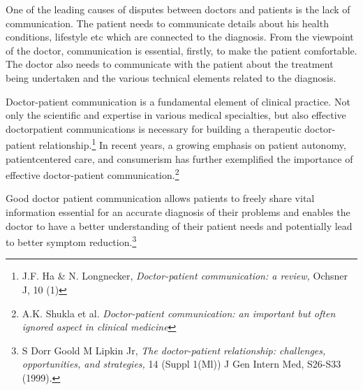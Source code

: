 \begin{multicols}{2}
\noi
One of the leading causes of disputes between doctors and patients is the lack of communication. The patient needs to communicate details about his health conditions, lifestyle etc which are connected to the diagnosis. From the viewpoint of the doctor, communication is essential, firstly, to make the patient comfortable. The doctor also needs to communicate with the patient about the treatment being undertaken and the various technical elements related to the diagnosis.

\noi
Doctor-patient communication is a fundamental element of clinical practice. Not only the scientific and expertise in various medical specialties, but also effective doctorpatient communications is necessary for building a therapeutic doctor-patient relationship.\footnote{J.F. Ha \& N. Longnecker, \textit{Doctor-patient communication: a review,} Ochsner J, 10 (1)} In recent years, a growing emphasis on patient autonomy, patientcentered care, and consumerism has further exemplified the importance of effective doctor-patient communication.\footnote{A.K. Shukla et al. \textit{Doctor-patient communication: an important but often ignored aspect in clinical medicine}}

\noi
Good doctor patient communication allows patients to freely share vital information essential for an accurate diagnosis of their problems and enables the doctor to have a better understanding of their patient needs and potentially lead to better symptom reduction.\footnote{S Dorr Goold M Lipkin Jr, \textit{The doctor-patient relationship: challenges, opportunities, and
strategies,} 14 (Suppl 1(Ml)) J Gen Intern Med, S26-S33 (1999).}



\end{multicols}
